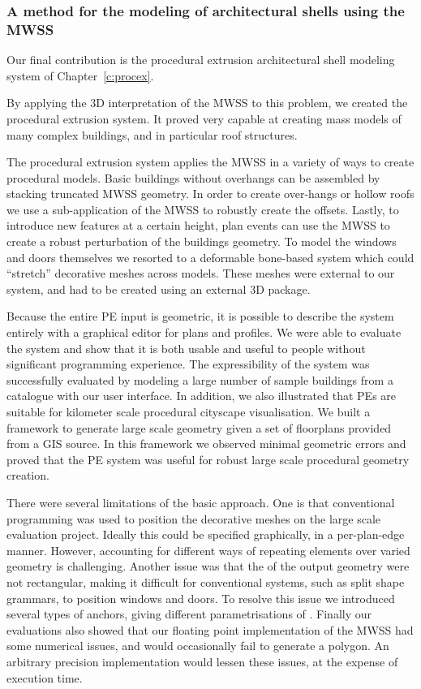
\subsubsection{A method for the modeling of architectural shells using the MWSS}

Our final contribution is the procedural extrusion architectural shell modeling system of Chapter~\ref{c:procex}.

By applying the 3D interpretation of the MWSS to this problem, we created the procedural extrusion system. It proved very capable at creating mass models of many complex buildings, and in particular roof structures.

The procedural extrusion system applies the MWSS in a variety of ways to create procedural models. Basic buildings without overhangs can be assembled by stacking truncated MWSS geometry. In order to create over-hangs or hollow roofs we use a sub-application of the MWSS to robustly create the offsets. Lastly, to introduce new features at a certain height, plan events can use the MWSS to create a robust perturbation of the buildings geometry. To model the windows and doors themselves we resorted to a deformable bone-based system which could ``stretch'' decorative meshes across models. These meshes were external to our system, and had to be created using an external 3D package. 

Because the entire PE input is geometric, it is possible to describe the system entirely with a graphical editor for plans and profiles. We were able to evaluate the system and show that it is both usable and useful to people without significant programming experience. The expressibility of the system was successfully evaluated by modeling a large number of sample buildings from a catalogue with our user interface. In addition, we also illustrated that PEs are suitable for kilometer scale procedural cityscape visualisation. We built a framework to generate large scale geometry given a set of floorplans provided from a GIS source. In this framework we observed minimal geometric errors and proved that the PE system was useful for robust large scale procedural geometry creation.

There were several limitations of the basic approach. One is that conventional programming was used to position the decorative meshes on the large scale evaluation project. Ideally this could be specified graphically, in a per-plan-edge manner. However, accounting for different ways of repeating elements over varied geometry is challenging. Another issue was that the \facades{} of the output geometry were not rectangular, making it difficult for conventional systems, such as split shape grammars, to position windows and doors. To resolve this issue we introduced several types of anchors, giving different parametrisations of \facades{}. Finally our evaluations also showed that our floating point implementation of the MWSS had some numerical issues, and would occasionally fail to generate a polygon. An arbitrary precision implementation would lessen these issues, at the expense of execution time.

